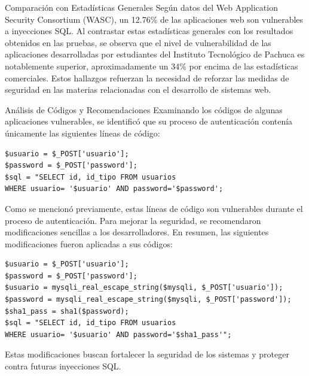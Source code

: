 \documentclass[11pt]{report}
\begin{document}
Comparación con Estadísticas Generales Según datos del Web Application Security Consortium (WASC), un 12.76\% de las aplicaciones web son vulnerables a inyecciones SQL. 
Al contrastar estas estadísticas generales con los resultados obtenidos en las pruebas, se observa que el nivel de vulnerabilidad de las aplicaciones desarrolladas por 
estudiantes del Instituto Tecnológico de Pachuca es notablemente superior, aproximadamente un 34\% por encima de las estadísticas comerciales. Estos hallazgos refuerzan 
la necesidad de reforzar las medidas de seguridad en las materias relacionadas con el desarrollo de sistemas web.

\cleardoublepage

Análisis de Códigos y Recomendaciones Examinando los códigos de algunas aplicaciones vulnerables, se identificó que su proceso de autenticación contenía únicamente las siguientes 
líneas de código:
\begin{verbatim}
$usuario = $_POST['usuario']; 
$password = $_POST['password'];
$sql = "SELECT id, id_tipo FROM usuarios 
WHERE usuario= '$usuario' AND password='$password';
\end{verbatim}

Como se mencionó previamente, estas líneas de código son vulnerables durante el proceso de autenticación. Para mejorar la seguridad, se recomendaron modificaciones sencillas a los desarrolladores. En resumen, las siguientes modificaciones fueron aplicadas a sus códigos:

\begin{verbatim}
$usuario = $_POST['usuario'];
$password = $_POST['password']; 
$usuario = mysqli_real_escape_string($mysqli, $_POST['usuario']); 
$password = mysqli_real_escape_string($mysqli, $_POST['password']); 
$sha1_pass = sha1($password);
$sql = "SELECT id, id_tipo FROM usuarios
WHERE usuario= '$usuario' AND password='$sha1_pass'";
\end{verbatim}

Estas modificaciones buscan fortalecer la seguridad de los sistemas y proteger contra futuras inyecciones SQL.

\cleardoublepage

\end{document}
